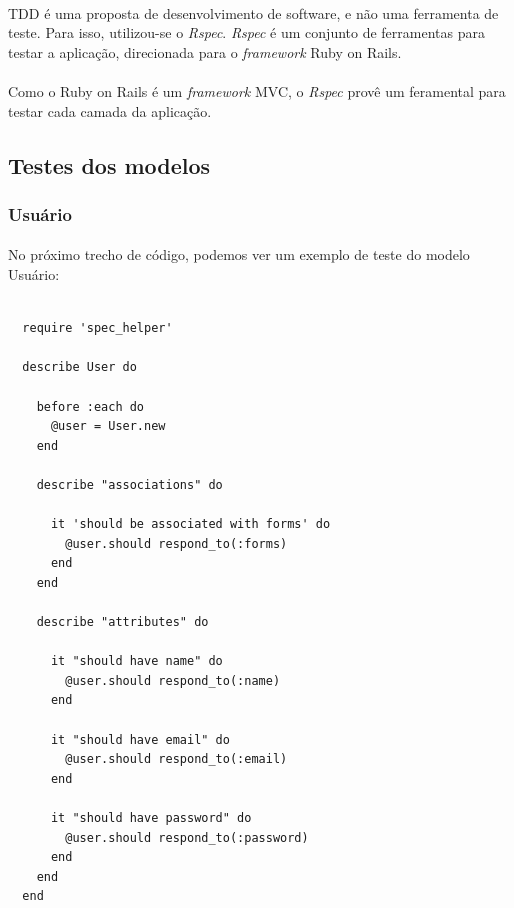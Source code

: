 \documentclass[11pt]{article}
\begin{document}
    \paragraph{}

    TDD é uma proposta de desenvolvimento de software, e não uma 
    ferramenta de teste. Para isso, utilizou-se o {\em Rspec}. {\em Rspec}
    é um conjunto de ferramentas para testar a aplicação, direcionada para o
    {\em framework} Ruby on Rails.
    
    \paragraph{}
    
    Como o Ruby on Rails é um {\em framework} MVC, o {\em Rspec} provê um
    feramental para testar cada camada da aplicação.
        
  \clearpage
    
    \subsection{Testes dos modelos}
    
    \subsubsection{Usuário}
      
    \paragraph{}
    No próximo trecho de código, podemos ver um exemplo de teste do modelo
    Usuário:
    
    {\scriptsize
      \lstset{language=Ruby}
      \begin{lstlisting}

  require 'spec_helper'

  describe User do

    before :each do
      @user = User.new
    end

    describe "associations" do
    
      it 'should be associated with forms' do
        @user.should respond_to(:forms)
      end
    end

    describe "attributes" do

      it "should have name" do
        @user.should respond_to(:name)
      end

      it "should have email" do
        @user.should respond_to(:email)
      end

      it "should have password" do
        @user.should respond_to(:password)
      end
    end
  end
      \end{lstlisting}
    }
    
\end{document}
